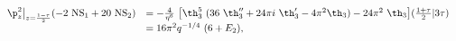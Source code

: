 \begin{equation}
  \begin{array}{rl}
    \p_z^2\big|_{z={1-\tau\over 2}}( -2 ~{\rm NS}_1 +20 ~{\rm NS}_2)
&= -{4\over\eta^6} ~\big[  \th_3^5 ~(36 ~\th_3'' + {24\pi i}
~\th_3' -4\pi^2\th_3) -24\pi^2 ~\th_3 \big]({1+\tau\over 2}|3\tau) \\
&= 16 \pi^2 q^{-1/4} ~(6+E_2),
  \end{array}
\end{equation}

